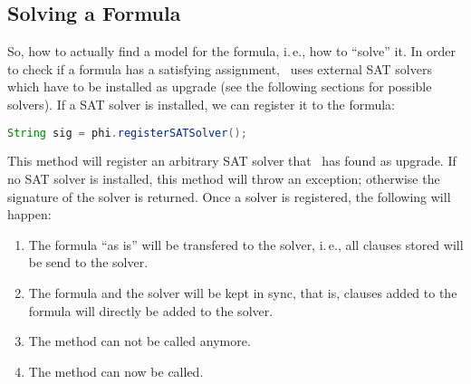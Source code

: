 \documentclass[a4paper, ukenglish, twoside, openright]{jdrasilmanual}
\begin{document}
\subsection{Solving a Formula}
So, 
how to actually find a model for the formula, i.\,e., how to
``solve'' it. In order to check if a formula has a satisfying
assignment, \Jdrasil\ uses external SAT solvers which have to be
installed as upgrade (see the following sections for possible
solvers). If a SAT solver is installed, we can register it to the
formula:
\begin{lstlisting}[language=Java]
  String sig = phi.registerSATSolver();
\end{lstlisting}
This method will register an arbitrary SAT solver that \Jdrasil\ has
found as upgrade. If no SAT solver is installed, this method will
throw an exception; otherwise the signature of the solver is
returned. Once a solver is registered, the following will happen:
\begin{enumerate}
  \item The formula ``as is'' will be transfered to the solver,
    i.\,e., all clauses stored will be send to the solver.
  \item The formula and the solver will be kept in sync, that is,
    clauses added to the formula will directly be added to the solver.
  \item The method  can not be called
    anymore.
  \item The method  can now be called.
\end{enumerate}
\end{document}
